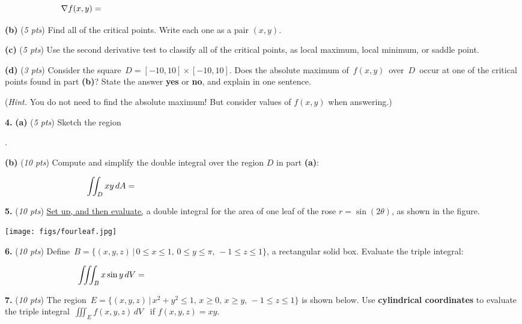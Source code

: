 \documentclass[11pt]{amsart}
\newcommand{\grad}{\nabla}
\newcommand{\prob}[1]{\bigskip\noindent\textbf{#1.} }
\newcommand{\pts}[1]{(\emph{#1 pts})}
\newcommand{\probpts}[2]{\prob{#1} \pts{#2} \quad}
\newcommand{\ppartpts}[2]{\textbf{(#1)} \pts{#2} \quad}
\newcommand{\epartpts}[2]{\medskip\noindent \textbf{(#1)} \pts{#2} \quad}
\begin{document}
\bigskip
    $$\grad f(x,y) = \hspace{6.0in}$$
\vspace{0.25in}

\epartpts{b}{5}  Find all of the critical points.  Write each one as a pair $(x,y)$.
\vfill

\epartpts{c}{5}  Use the second derivative test to classify all of the critical points, as local maximum, local minimum, or saddle point.
\vfill

\epartpts{d}{3}  Consider the square \,{\large $D = [-10,10]\times [-10,10]$}.  Does the absolute maximum of \,{\large $f(x,y)$}\, over \,{\large $D$}\, occur at one of the critical points found in part \textbf{(b)}?  State the answer \textbf{yes} or \textbf{no}, and explain in one sentence.

\medskip \noindent
(\emph{Hint.}  You do not need to find the absolute maximum!  But consider values of $f(x,y)$ when answering.)
\vspace{1.0in}


\clearpage\newpage
\prob{4}  \ppartpts{a}{5}  Sketch the region

\medskip
{}.
\vfill

\epartpts{b}{10}  Compute and simplify the double integral over the region $D$ in part \textbf{(a)}:

\bigskip
$$\iint_D xy\,dA = \hspace{5.0in}$$
\vspace{2.5in}

\probpts{5}{10}  \underline{Set up, and then evaluate,} a double integral for the area of one leaf of the rose $r=\sin (2\theta)$, as shown in the figure.

\hfill \texttt{[image: figs/fourleaf.jpg]}
\vspace{1.0in}



\clearpage\newpage
\probpts{6}{10}  Define \,{\large $B = \Big\{(x,y,z)\,\big|\, 0\le x\le 1, \, 0 \le y \le \pi, \, -1 \le z \le 1\Big\}$}, a rectangular solid box.  Evaluate the triple integral: 

\bigskip
$$\iiint_B x \sin y\,dV = \hspace{5.0in}$$
\vfill

\probpts{7}{10}  The region \,{\large $E = \Big\{(x,y,z)\,\big|\, x^2 + y^2 \le 1, \, x \ge 0, \, x \ge y, \, -1 \le z \le 1\Big\}$} is shown below.  Use \textbf{cylindrical coordinates} to evaluate the triple integral \,{\large $\iiint_E f(x,y,z) \,dV$} \, if $f(x,y,z)=xy$.
\end{document}
